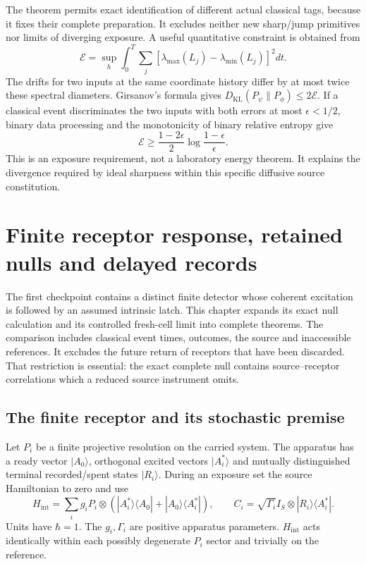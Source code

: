 \documentclass[11pt,oneside,openany]{book}
\theoremstyle{definition}
\theoremstyle{remark}\newtheorem{remark}[theorem]{Remark}
\begin{document}
The theorem permits exact identification of different actual classical
tags, because it fixes their complete preparation. It excludes neither
new sharp/jump primitives nor limits of diverging exposure. A useful
quantitative constraint is obtained from
\[
 \mathcal E=\sup_h\int_0^T\sum_j
 [\lambda_{\max}(L_j)-\lambda_{\min}(L_j)]^2dt.
\]
The drifts for two inputs at the same coordinate history differ by at
most twice these spectral diameters. Girsanov's formula gives
$D_{\mathrm{KL}}(P_\psi\|P_\phi)\le2\mathcal E$.
If a classical event discriminates the two inputs with both errors at
most $\epsilon<1/2$, binary data processing and the monotonicity of
binary relative entropy give
\begin{equation}
 \mathcal E\ge\frac{1-2\epsilon}{2}
                       \log\frac{1-\epsilon}{\epsilon}.      \label{det:exposure-lower}
\end{equation}
This is an exposure requirement, not a laboratory energy theorem.
It explains the divergence required by ideal sharpness within this
specific diffusive source constitution.

\chapter{Finite receptor response, retained nulls and delayed records}
\label{det:chapter-response}

The first checkpoint \cite{C01} contains a distinct finite detector
whose coherent excitation is followed by an assumed intrinsic latch.
This chapter expands its exact null calculation and its controlled
fresh-cell limit into complete theorems. The comparison includes
classical event times, outcomes, the source and inaccessible references.
It excludes the future return of receptors that have been discarded.
That restriction is essential: the exact complete null contains
source--receptor correlations which a reduced source instrument omits.

\section{The finite receptor and its stochastic premise}

Let $P_i$ be a finite projective resolution on the carried system.
The apparatus has a ready vector $|A_0\rangle$, orthogonal excited
vectors $|A_i^*\rangle$ and mutually distinguished terminal
recorded/spent states $|R_i\rangle$. During an exposure set the source
Hamiltonian to zero and use
\begin{equation}
 H_{\mathrm{int}}=\sum_i g_iP_i\otimes
       (|A_i^*\rangle\langle A_0|+|A_0\rangle\langle A_i^*|),
 \qquad C_i=\sqrt{\Gamma_i}I_S\otimes
                     |R_i\rangle\langle A_i^*|.             \label{det:receptor}
\end{equation}
Units have $\hbar=1$. The $g_i,\Gamma_i$ are positive apparatus
parameters. $H_{\mathrm{int}}$ acts identically within each possibly
degenerate $P_i$ sector and trivially on the reference.
\end{document}
